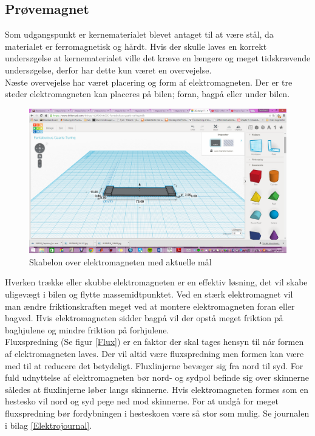 \subsection{Prøvemagnet}
Som udgangspunkt er kernematerialet blevet antaget til at være stål, da materialet er ferromagnetisk og hårdt. Hvis der skulle laves en korrekt undersøgelse at kernematerialet ville det kræve en længere og meget tidskrævende undersøgelse, derfor har dette kun været en overvejelse. \\
Næste overvejelse har været placering og form af elektromagneten. Der er tre steder elektromagneten kan placeres på bilen; foran, bagpå eller under bilen.\\
\begin{figure}
\center
\includegraphics[scale=0.17]{./Graphics/Elektromagnet_2D}
\caption{Skabelon over elektromagneten med aktuelle mål}
\label{Elektromagnet_skabelon}
\end{figure}

Hverken trække eller skubbe elektromagneten er en effektiv løsning, det vil skabe uligevægt i bilen og flytte massemidtpunktet. Ved en stærk elektromagnet vil man ændre friktionskraften meget ved at montere elektromagneten foran eller bagved. Hvis elektromagneten sidder bagpå vil der opstå meget friktion på baghjulene og mindre friktion på forhjulene.\\
Fluxspredning (Se figur \ref{Flux}) er en faktor der skal tages hensyn til når formen af elektromagneten laves. Der vil altid være fluxspredning men formen kan være med til at reducere det betydeligt. Fluxlinjerne bevæger sig fra nord til syd. For fuld udnyttelse af elektromagneten bør nord- og sydpol befinde sig over skinnerne således at fluxlinjerne løber langs skinnerne. Hvis elektromagneten formes som en hestesko vil nord og syd pege ned mod skinnerne. For at undgå for meget fluxspredning bør fordybningen i hesteskoen være så stor som mulig. Se journalen i bilag \ref{Elektrojournal}.\\

